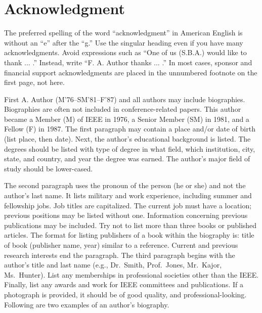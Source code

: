 \documentclass{ieeeaccess}
\begin{document}
\section*{Acknowledgment}

The preferred spelling of the word ``acknowledgment'' in American English is 
without an ``e'' after the ``g.'' Use the singular heading even if you have 
many acknowledgments. Avoid expressions such as ``One of us (S.B.A.) would 
like to thank $\ldots$ .'' Instead, write ``F. A. Author thanks $\ldots$ .'' In most 
cases, sponsor and financial support acknowledgments are placed in the 
unnumbered footnote on the first page, not here.






\begin{IEEEbiography}{First A. Author} (M'76--SM'81--F'87) and all authors may include 
biographies. Biographies are often not included in conference-related
papers. This author became a Member (M) of IEEE in 1976, a Senior
Member (SM) in 1981, and a Fellow (F) in 1987. The first paragraph may
contain a place and/or date of birth (list place, then date). Next,
the author's educational background is listed. The degrees should be
listed with type of degree in what field, which institution, city,
state, and country, and year the degree was earned. The author's major
field of study should be lower-cased. 

The second paragraph uses the pronoun of the person (he or she) and not the 
author's last name. It lists military and work experience, including summer 
and fellowship jobs. Job titles are capitalized. The current job must have a 
location; previous positions may be listed 
without one. Information concerning previous publications may be included. 
Try not to list more than three books or published articles. The format for 
listing publishers of a book within the biography is: title of book 
(publisher name, year) similar to a reference. Current and previous research 
interests end the paragraph. The third paragraph begins with the author's 
title and last name (e.g., Dr.\ Smith, Prof.\ Jones, Mr.\ Kajor, Ms.\ Hunter). 
List any memberships in professional societies other than the IEEE. Finally, 
list any awards and work for IEEE committees and publications. If a 
photograph is provided, it should be of good quality, and 
professional-looking. Following are two examples of an author's biography.
\end{IEEEbiography}
\end{document}
